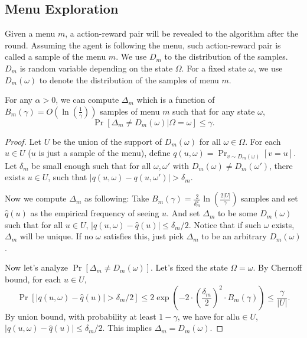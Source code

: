 \subsection{Menu Exploration}
\label{sec:private_menu}
Given a menu $m$, a action-reward pair will be revealed to the algorithm after the round. Assuming the agent is following the menu, such action-reward pair is called a sample of the menu $m$. We use $D_m$ to the distribution of the samples. $D_m$ is random variable depending on the state $\Omega$. For a fixed state $\omega$, we use $D_m(\omega)$ to denote the distribution of the samples of menu $m$. 

\begin{lemma}
\label{lem:deltam}
For any $\alpha > 0$, we can compute $\Delta_m$ which is a function of $B_m(\gamma) = O\left(\ln\left(\frac{1}{\gamma}\right)\right)$ samples of menu $m$ such that for any state $\omega$, 
\[
\Pr[\Delta_m \neq D_m(\omega) | \Omega = \omega] \leq \gamma.
\]
\end{lemma}

\begin{proof}
Let $U$ be the union of the support of $D_m(\omega)$ for all $\omega \in \varOmega$. For each $u \in U$ ($u$ is just a sample of the menu), define $q(u,\omega) = \Pr_{v \sim D_m(\omega)}[v = u]$. Let $\delta_m$ be small enough such that for all $\omega, \omega'$ with $D_m(\omega) \neq D_m(\omega')$, there exists $u \in U$, such that $|q(u,\omega) - q(u,\omega')| > \delta_m$. 

Now we compute $\Delta_m$ as following: Take $B_m(\gamma) = \frac{2}{\delta_m^2}\ln\left(\frac{2|U|}{\gamma}\right) $ samples and set $\hat{q}(u)$ as the empirical frequency of seeing $u$. And set $\Delta_m$ to be some $D_m(\omega)$ such that for all $u \in U$, $|q(u,\omega) - \hat{q}(u)| \leq \delta_m / 2$. Notice that if such $\omega$ exists, $\Delta_m$ will be unique. If no $\omega$ satisfies this, just pick $\Delta_m$ to be an arbitrary $D_m(\omega)$. 

Now let's analyze $\Pr[\Delta_m \neq D_m(\omega)]$. Let's fixed the state $\Omega = \omega$. By Chernoff bound, for each $u \in U$, 
\[
\Pr[|q(u,\omega) -\hat{q}(u)| > \delta_m/2] \leq 2\exp\left(-2 \cdot \left(\frac{\delta_m}{2}\right)^2 \cdot B_m(\gamma)\right) \leq \frac{\gamma}{|U|}.
\]
By union bound, with probability at least $1-\gamma$, we have for all$u \in U$, $|q(u,\omega) - \hat{q}(u)| \leq \delta_m / 2$. This implies $\Delta_m = D_m(\omega)$. 
\end{proof}


